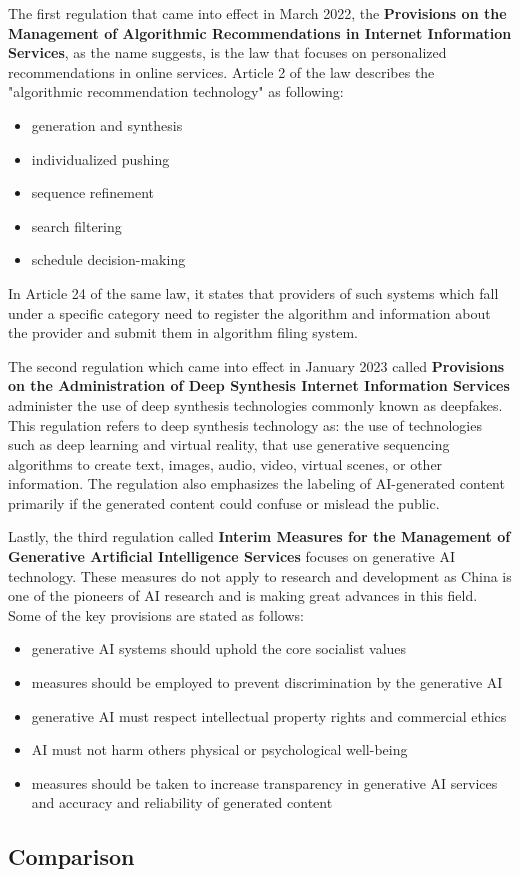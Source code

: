 The first regulation that came into effect in March 2022, the \textbf{Provisions on the Management of Algorithmic Recommendations in Internet Information Services}\cite{ProvisionsAlgorithmicRecommendations2022}\cite{CACAlgorithmicRecommendations2022}, as the name suggests, is the law that focuses on personalized recommendations in online services. Article 2 of the law describes the "algorithmic recommendation technology" as following:
\begin{itemize}
    \item generation and synthesis
    \item individualized pushing
    \item sequence refinement
    \item search filtering
    \item schedule decision-making
\end{itemize}
In Article 24 of the same law, it states that providers of such systems which fall under a specific category need to register the algorithm and information about the provider and submit them in algorithm filing system.

The second regulation which came into effect in January 2023 called \textbf{Provisions on the Administration of Deep Synthesis Internet Information Services}\cite{ProvisionsDeepSynthesis2022}\cite{CACDeepSynthesisRegulations2023} administer the use of deep synthesis technologies commonly known as deepfakes. This regulation refers to deep synthesis technology as: the use of technologies such as deep learning and virtual reality, that use generative sequencing algorithms to create text, images, audio, video, virtual scenes, or other information. The regulation also emphasizes the labeling of AI-generated content primarily if the generated content could confuse or mislead the public.

Lastly, the third regulation called \textbf{Interim Measures for the Management of Generative Artificial Intelligence Services}\cite{InterimMeasuresGenerativeAI2023}\cite{CACGenerativeAIInterim2023} focuses on generative AI technology. These measures do not apply to research and development as China is one of the pioneers of AI research and is making great advances in this field. Some of the key provisions are stated as follows:
\begin{itemize}
    \item generative AI systems should uphold the core socialist values
    \item measures should be employed to prevent discrimination by the generative AI
    \item generative AI must respect intellectual property rights and commercial ethics
    \item AI must not harm others physical or psychological well-being
    \item measures should be taken to increase transparency in generative AI services and accuracy and reliability of generated content
\end{itemize}

\subsection{Comparison}
